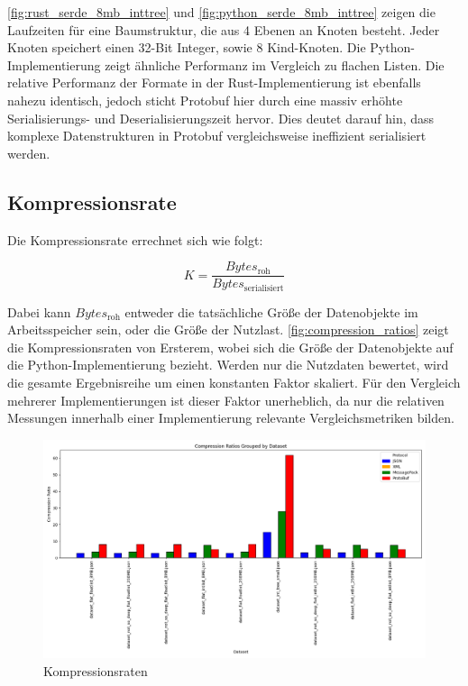 \documentclass[ngerman]{seminarvorlage}
\begin{document}
\autoref{fig:rust_serde_8mb_inttree} und \autoref{fig:python_serde_8mb_inttree} zeigen die Laufzeiten für eine Baumstruktur, die aus 4 Ebenen an Knoten besteht. Jeder Knoten speichert einen 32-Bit Integer, sowie 8 Kind-Knoten. Die Python-Implementierung zeigt ähnliche Performanz im Vergleich zu flachen Listen. Die relative Performanz der Formate in der Rust-Implementierung ist ebenfalls nahezu identisch, jedoch sticht Protobuf hier durch eine massiv erhöhte Serialisierungs- und Deserialisierungszeit hervor. Dies deutet darauf hin, dass komplexe Datenstrukturen in Protobuf vergleichsweise ineffizient serialisiert werden.

\subsection{Kompressionsrate}

Die Kompressionsrate errechnet sich wie folgt:

$$ K = \frac{Bytes_\text{roh}}{Bytes_\text{serialisiert}} $$

Dabei kann $ Bytes_\text{roh} $ entweder die tatsächliche Größe der Datenobjekte im Arbeitsspeicher sein, oder die Größe der Nutzlast. \autoref{fig:compression_ratios} zeigt die Kompressionsraten von Ersterem, wobei sich die Größe der Datenobjekte auf die Python-Implementierung bezieht. Werden nur die Nutzdaten bewertet, wird die gesamte Ergebnisreihe um einen konstanten Faktor skaliert. Für den Vergleich mehrerer Implementierungen ist dieser Faktor unerheblich, da nur die relativen Messungen innerhalb einer Implementierung relevante Vergleichsmetriken bilden.

\begin{figure}[t] %
  \centering
  \includegraphics[width=\textwidth]{images/graphs/combined_compression_ratios.png} %
  \caption{Kompressionsraten}
  \label{fig:compression_ratios}
\end{figure}
\end{document}
